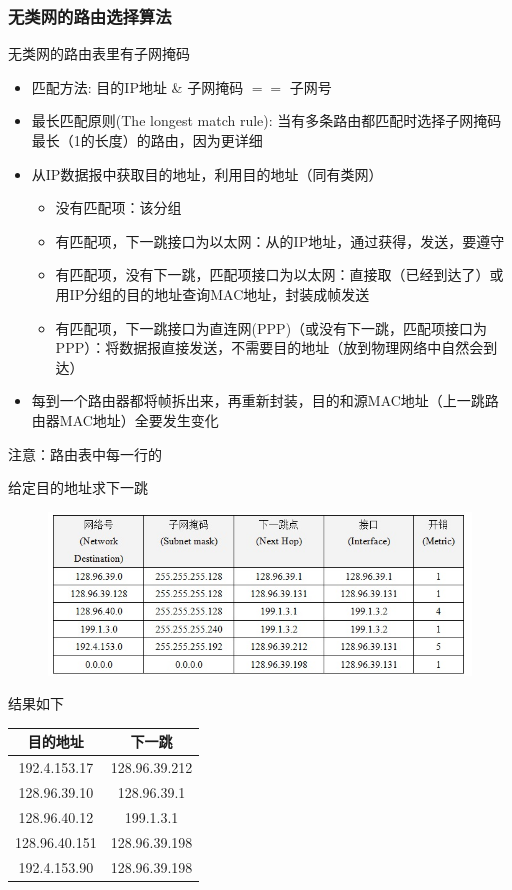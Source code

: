\subsubsection{无类网的路由选择算法}
无类网的路由表里有子网掩码
\begin{itemize}
	\item 匹配方法: 目的IP地址 \& 子网掩码 $==$ 子网号
	\item 最长匹配原则(The longest match rule): 当有多条路由都匹配时选择子网掩码最长（1的长度）的路由，因为更详细
	\item 从IP数据报中获取目的地址，利用目的地址（同有类网）
	\begin{itemize}
		\item 没有匹配项：该分组
		\item 有匹配项，下一跳接口为以太网：从的IP地址，通过获得，发送，要遵守
		\item 有匹配项，没有下一跳，匹配项接口为以太网：直接取（已经到达了）或用IP分组的目的地址查询MAC地址，封装成帧发送
		\item 有匹配项，下一跳接口为直连网(PPP)（或没有下一跳，匹配项接口为PPP）：将数据报直接发送，不需要目的地址（放到物理网络中自然会到达）
	\end{itemize}
	\item 每到一个路由器都将帧拆出来，再重新封装，目的和源MAC地址（上一跳路由器MAC地址）全要发生变化
\end{itemize}
注意：路由表中每一行的

\begin{example}
	给定目的地址求下一跳
\begin{figure}[H]
	\centering
	\includegraphics[width=0.8\linewidth]{fig/router_table_example.jpg}
\end{figure}
\end{example}
\begin{analysis}
	结果如下
	\begin{center}
		\begin{tabular}{cc}\hline
			目的地址 & 下一跳\\\hline
			192.4.153.17 & 128.96.39.212\\
			128.96.39.10 & 128.96.39.1\\
			128.96.40.12 & 199.1.3.1\\
			128.96.40.151 & 128.96.39.198\\
			192.4.153.90 & 128.96.39.198\\\hline
		\end{tabular}
	\end{center}
\end{analysis}

